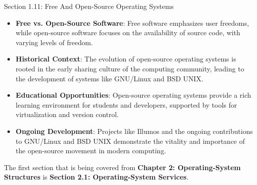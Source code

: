 \begin{notes}{Section 1.11: Free And Open-Source Operating Systems}
\begin{highlight}
    \end{highlight}
    
    \begin{highlight}
    
    \begin{itemize}
        \item \textbf{Free vs. Open-Source Software}: Free software emphasizes user freedoms, while open-source software focuses on the availability of source code, with varying levels of freedom.
        \item \textbf{Historical Context}: The evolution of open-source operating systems is rooted in the early sharing culture of the computing community, leading to the development of systems like GNU/Linux and BSD UNIX.
        \item \textbf{Educational Opportunities}: Open-source operating systems provide a rich learning environment for students and developers, supported by tools for virtualization and version control.
        \item \textbf{Ongoing Development}: Projects like Illumos and the ongoing contributions to GNU/Linux and BSD UNIX demonstrate the vitality and importance of the open-source movement in modern computing.
    \end{itemize}
    
    \end{highlight}
\end{notes}

The first section that is being covered from \textbf{Chapter 2: Operating-System Structures} is \textbf{Section 2.1: Operating-System Services}.

